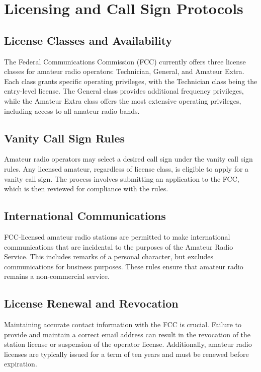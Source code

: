 \section{Licensing and Call Sign Protocols}
\label{sec:licensing_call_signs}

\subsection*{License Classes and Availability}
The Federal Communications Commission (FCC) currently offers three license classes for amateur radio operators: Technician, General, and Amateur Extra. Each class grants specific operating privileges, with the Technician class being the entry-level license. The General class provides additional frequency privileges, while the Amateur Extra class offers the most extensive operating privileges, including access to all amateur radio bands.

\subsection*{Vanity Call Sign Rules}
Amateur radio operators may select a desired call sign under the vanity call sign rules. Any licensed amateur, regardless of license class, is eligible to apply for a vanity call sign. The process involves submitting an application to the FCC, which is then reviewed for compliance with the rules. 

\subsection*{International Communications}
FCC-licensed amateur radio stations are permitted to make international communications that are incidental to the purposes of the Amateur Radio Service. This includes remarks of a personal character, but excludes communications for business purposes. These rules ensure that amateur radio remains a non-commercial service.

\subsection*{License Renewal and Revocation}
Maintaining accurate contact information with the FCC is crucial. Failure to provide and maintain a correct email address can result in the revocation of the station license or suspension of the operator license. Additionally, amateur radio licenses are typically issued for a term of ten years and must be renewed before expiration.

